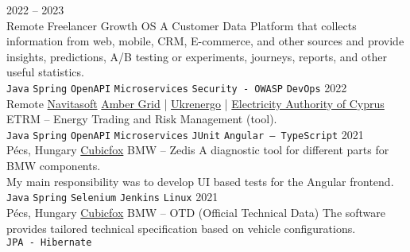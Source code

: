 \documentclass[9pt]{developercv} %
\begin{document}


\begin{entrylist}
    \entry
        {2022 -- 2023 \\ Remote}
        {Freelancer}
        {Growth OS}
        {A Customer Data Platform that collects information from web, mobile, CRM, E-commerce, and other sources 
        and provide insights, predictions, A/B testing or experiments, journeys, reports, and other useful statistics.\\
            \texttt{Java}\slashsep
            \texttt{Spring}\slashsep
            \texttt{OpenAPI}\slashsep
            \texttt{Microservices}\slashsep
            \texttt{Security - OWASP}\slashsep
            \texttt{DevOps}
        }
    \entry
        {2022 \\ Remote}
        {\href{https://navitasoft.com/en}{Navitasoft}}
        {\href{https://www.ambergrid.lt/en/}{Amber Grid} | \href{https://en.wikipedia.org/wiki/Ukrenergo}{Ukrenergo} | \href{https://en.wikipedia.org/wiki/Electricity_Authority_of_Cyprus}{Electricity Authority of Cyprus}}
        {ETRM -- Energy Trading and Risk Management (tool). \\
            \texttt{Java}\slashsep
            \texttt{Spring}\slashsep
            \texttt{OpenAPI}\slashsep
            \texttt{Microservices}\slashsep
            \texttt{JUnit}\slashsep
            \texttt{Angular -- TypeScript}
        }
    \entry
        {2021 \\ Pécs, Hungary}
        {\href{https://cubicfox.com/}{Cubicfox}}
        {BMW -- Zedis}
        {A diagnostic tool for different parts for BMW components.\\
            My main responsibility was to develop UI based tests for the Angular frontend.\\
            \texttt{Java}\slashsep
            \texttt{Spring}\slashsep
            \texttt{Selenium}\slashsep
            \texttt{Jenkins}\slashsep
            \texttt{Linux}
        }
    \entry
        {2021 \\ Pécs, Hungary}
        {\href{https://cubicfox.com/}{Cubicfox}}
        {BMW -- OTD (Official Technical Data)}
        {The software provides tailored technical specification based on vehicle configurations. \\
            \texttt{JPA - Hibernate}\slashsep
}
\end{entrylist}
\end{document}
